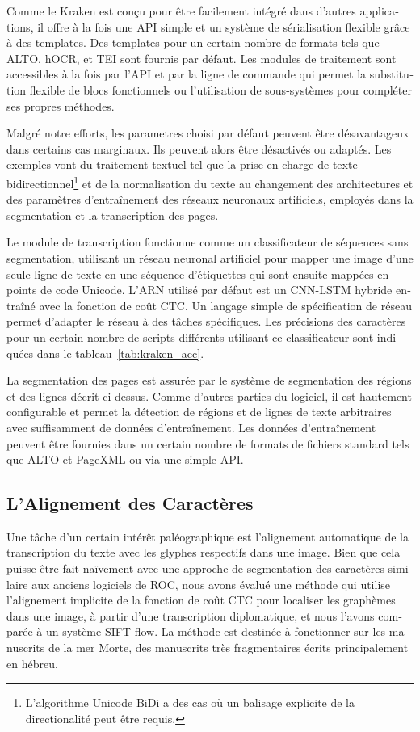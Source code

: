 \begin{french}
Comme le Kraken est conçu pour être facilement intégré dans d'autres
applications, il offre à la fois une API simple et un système de sérialisation
flexible grâce à des templates. Des templates pour un certain nombre de formats
tels que ALTO, hOCR, et TEI sont fournis par défaut. Les modules de traitement
sont accessibles à la fois par l'API et par la ligne de commande qui permet la
substitution flexible de blocs fonctionnels ou l'utilisation de sous-systèmes
pour compléter ses propres méthodes.

Malgré notre efforts, les parametres choisi par défaut peuvent être désavantageux dans certains cas marginaux.
Ils peuvent alors être désactivés ou adaptés. Les exemples vont du traitement textuel tel que la prise en charge
de texte bidirectionnel\footnote{L'algorithme Unicode BiDi a des cas où un
balisage explicite de la directionalité peut être requis.} et de la
normalisation du texte au changement des architectures et des paramètres
d'entraînement des réseaux neuronaux artificiels, employés dans la segmentation
et la transcription des pages.

Le module de transcription fonctionne comme un classificateur de séquences sans
segmentation, utilisant un réseau neuronal artificiel pour mapper une image
d'une seule ligne de texte en une séquence d'étiquettes qui sont ensuite
mappées en points de code Unicode.  L'ARN utilisé par défaut est un CNN-LSTM
hybride entraîné avec la fonction de coût CTC. Un langage simple de
spécification de réseau permet d'adapter le réseau à des tâches spécifiques.
Les précisions des caractères pour un certain nombre de scripts différents
utilisant ce classificateur sont indiquées dans le tableau~\ref{tab:kraken_acc}.

La segmentation des pages est assurée par le système de segmentation des
régions et des lignes décrit ci-dessus. Comme d'autres parties du logiciel, il
est hautement configurable et permet la détection de régions et de lignes de
texte arbitraires avec suffisamment de données d'entraînement. Les données
d'entraînement peuvent être fournies dans un certain nombre de formats de
fichiers standard tels que ALTO et PageXML ou via une simple API.

\subsection{L'Alignement des Caractères}

Une tâche d'un certain intérêt paléographique est l'alignement automatique de
la transcription du texte avec les glyphes respectifs dans une image. Bien que
cela puisse être fait naïvement avec une approche de segmentation des
caractères similaire aux anciens logiciels de ROC, nous avons évalué une
méthode qui utilise l'alignement implicite de la fonction de coût CTC pour
localiser les graphèmes dans une image, à partir d'une transcription
diplomatique, et nous l'avons comparée à un système SIFT-flow. La méthode est
destinée à fonctionner sur les manuscrits de la mer Morte, des manuscrits très
fragmentaires écrits principalement en hébreu.


\end{french}
